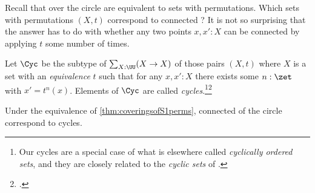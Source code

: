 Recall that \coverings over the circle are equivalent to sets with permutations.
Which sets with permutations $(X,t)$ correspond to connected \coverings?
It is not so surprising that the answer has to do with whether
any two points $x,x':X$ can be connected by applying $t$ some number of times.
\begin{definition}\label{def:Cyc}
  Let $\Cyc$ be the subtype of $\sum_{X:\UU}(X\to X)$ of those
  pairs $(X,t)$ where $X$ is a \emph{\nonempty} set with an \emph{equivalence} $t$
  such that for any $x,x':X$
  there exists some $n:\zet$ with $x' = t^n(x)$.
  Elements of $\Cyc$ are called \emph{cycles}.\footnote{%
    Our cycles are a special case of what is elsewhere called
    \emph{cyclically ordered sets},
    and they are closely related to the \emph{cyclic sets} of
    \citeauthor{Connes1983}\footnotemark{}.}\footcitetext{Connes1983}
\end{definition}
\begin{theorem}\label{thm:cycset-connS1cover}
  Under the equivalence of \cref{thm:coveringsofS1perms},
  connected \coverings of the circle correspond to cycles.
\end{theorem}
